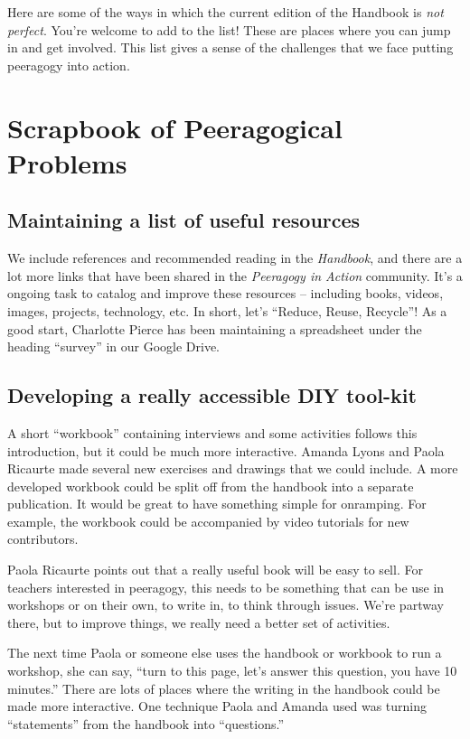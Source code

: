 Here are some of the ways in which the current edition of the Handbook
is \emph{not perfect}. You're welcome to add to the list! These are
places where you can jump in and get involved. This list gives a sense
of the challenges that we face putting peeragogy into action.

\section{Scrapbook of Peeragogical Problems}\label{scrapbook-of-peeragogical-problems}

\subsection{Maintaining a list of useful resources}\label{maintaining-a-list-of-useful-resources}

We include references and recommended reading in the \emph{Handbook},
and there are a lot more links that have been shared in the
\emph{Peeragogy in Action} community. It's a ongoing task to catalog and
improve these resources -- including books, videos, images, projects,
technology, etc. In short, let's ``Reduce, Reuse, Recycle''! As a good
start, Charlotte Pierce has been maintaining a spreadsheet under the
heading ``survey'' in our Google Drive.

\subsection{Developing a really accessible DIY tool-kit}

A short ``workbook'' containing interviews and some activities follows
this introduction, but it could be much more interactive. Amanda Lyons
and Paola Ricaurte made several new exercises and drawings that we could
include. A more developed workbook could be split off from the handbook
into a separate publication. It would be great to have something simple
for onramping. For example, the workbook could be accompanied by video
tutorials for new contributors.

Paola Ricaurte points out that a really useful book will be easy to
sell. For teachers interested in peeragogy, this needs to be something
that can be use in workshops or on their own, to write in, to think
through issues. We're partway there, but to improve things, we really
need a better set of activities.

The next time Paola or someone else uses the handbook or workbook to run
a workshop, she can say, ``turn to this page, let's answer this
question, you have 10 minutes.'' There are lots of places where the
writing in the handbook could be made more interactive. One technique
Paola and Amanda used was turning ``statements'' from the handbook into
``questions.''

